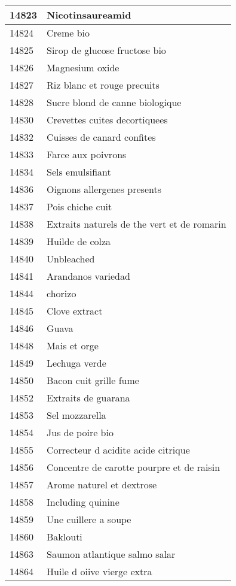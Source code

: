 \begin{longtable}{|l|l|}
14823 & Nicotinsaureamid \\ \hline 
14824 & Creme bio \\ \hline 
14825 & Sirop de glucose fructose bio \\ \hline 
14826 & Magnesium oxide \\ \hline 
14827 & Riz blanc et rouge precuits \\ \hline 
14828 & Sucre blond de canne biologique \\ \hline 
14830 & Crevettes cuites decortiquees \\ \hline 
14832 & Cuisses de canard confites \\ \hline 
14833 & Farce aux poivrons \\ \hline 
14834 & Sels emulsifiant \\ \hline 
14836 & Oignons allergenes presents \\ \hline 
14837 & Pois chiche cuit \\ \hline 
14838 & Extraits naturels de the vert et de romarin \\ \hline 
14839 & Huilde de colza \\ \hline 
14840 & Unbleached \\ \hline 
14841 & Arandanos variedad \\ \hline 
14844 & chorizo \\ \hline 
14845 & Clove extract \\ \hline 
14846 & Guava \\ \hline 
14848 & Mais et orge \\ \hline 
14849 & Lechuga verde \\ \hline 
14850 & Bacon cuit grille fume \\ \hline 
14852 & Extraits de guarana \\ \hline 
14853 & Sel mozzarella \\ \hline 
14854 & Jus de poire bio \\ \hline 
14855 & Correcteur d acidite acide citrique \\ \hline 
14856 & Concentre de carotte pourpre et de raisin \\ \hline 
14857 & Arome naturel et dextrose \\ \hline 
14858 & Including quinine \\ \hline 
14859 & Une cuillere a soupe \\ \hline 
14860 & Baklouti \\ \hline 
14863 & Saumon atlantique salmo salar \\ \hline 
14864 & Huile d oiive vierge extra \\ \hline 

\end{longtable}
